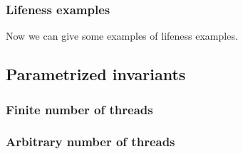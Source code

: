\subsubsection{Lifeness examples}

Now we can give some examples of lifeness examples.


\subsection{Parametrized invariants}

\subsubsection{Finite number of threads}

\subsubsection{Arbitrary number of threads}

